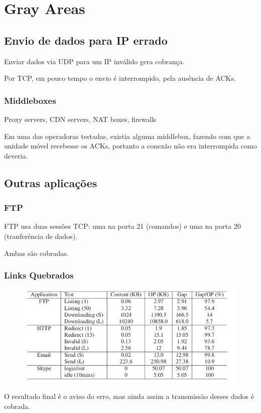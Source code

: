 \documentclass[brazil]{beamer}
\begin{document}
\section{Gray Areas}

\subsection{Envio de dados para IP errado}

\begin{frame}[fragile]
    Enviar dados via UDP para um IP inválido gera cobrança.

    \vspace{0.4cm}
    Por TCP, em pouco tempo o envio é interrompido, pela ausência de ACKs.
\end{frame}

\begin{frame}[fragile]
    \frametitle{Middleboxes}
    Proxy servers, CDN servers, NAT boxes, firewalls

    \vspace{0.4cm}
    \pause
    Em uma das operadoras testadas, existia alguma middlebox, fazendo com que a unidade móvel recebesse os ACKs, portanto a conexão não era interrompida como deveria.
\end{frame}

\subsection{Outras aplicações}

\begin{frame}[fragile]
    \frametitle{FTP}
    FTP usa duas sessões TCP: uma na porta 21 (comandos) e uma na porta 20 (tranferência de dados).

    \vspace{0.5cm}
    Ambas são cobradas.
\end{frame}

\begin{frame}[fragile]
    \frametitle{Links Quebrados}
    \begin{figure}
    \begin{center}
        \includegraphics[scale=0.3]{images/applications.jpg}
    \end{center}
    \end{figure}
    O resultado final é o aviso do erro, mas ainda assim a transmissão desses dados é cobrada.

\end{frame}
\end{document}
